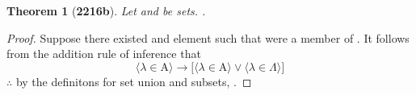 \documentclass[preview]{standalone}
\newtheorem*{theorem*}{Theorem}
\begin{document}
\begin{theorem*}[\textbf{2216b}] \color{black}
    Let  and \bm{$\Lambda$} be sets. 
    .
\end{theorem*}
\begin{proof} \color{black}
    Suppose there existed and element \bm{$\lambda$} such that 
    \bm{$\lambda$} were a member of .
    It follows from the addition rule of inference that
    \begin{equation*}
        \Big \langle \lambda \in \mathrm{A} \Big \rangle
            \rightarrow
        \bigg[ 
            \Big \langle \lambda \in \mathrm{A} \Big \rangle
                \lor 
            \Big \langle \lambda \in \Lambda \Big \rangle
        \bigg]
    \end{equation*}
    $\therefore$ by the definitons for set union and subsets,
    .
\color{lightgray} \end{proof}
\end{document}

